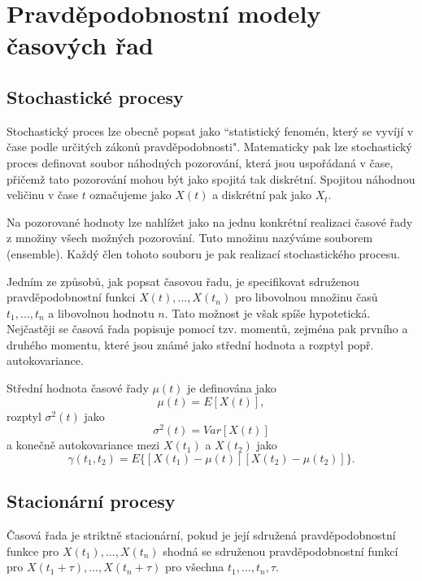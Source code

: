 \chapter{Pravděpodobnostní modely časových řad}

\section{Stochastické procesy}

Stochastický proces lze obecně popsat jako ``statistický fenomén, který se vyvíjí v čase podle určitých zákonů pravděpodobnosti". Matematicky pak lze stochastický proces definovat soubor náhodných pozorování, která jsou uspořádaná v čase, přičemž tato pozorování mohou být jako spojitá tak diskrétní. Spojitou náhodnou veličinu v čase $t$ označujeme jako $X(t)$ a diskrétní pak jako $X_t$.

Na pozorované hodnoty lze nahlížet jako na jednu konkrétní realizaci časové řady z množiny všech možných pozorování. Tuto množinu nazýváme souborem (ensemble). Každý člen tohoto souboru je pak realizací stochastického procesu.

Jedním ze způsobů, jak popsat časovou řadu, je specifikovat sdruženou pravděpodobnostní funkci $X(t), ..., X(t_n)$ pro libovolnou množinu časů $t_1, ..., t_n$ a libovolnou hodnotu $n$. Tato možnost je však spíše hypotetická. Nejčastěji se časová řada popisuje pomocí tzv. momentů, zejména pak prvního a druhého momentu, které jsou známé jako střední hodnota a rozptyl popř. autokovariance.

Střední hodnota časové řady $\mu(t)$ je definována jako
\begin{equation}
\mu(t) = E[X(t)],
\end{equation}
rozptyl $\sigma^2(t)$ jako
\begin{equation}
\sigma^2(t) = Var[X(t)]
\end{equation}
a konečně autokovariance mezi $X(t_1)$ a $X(t_2)$ jako
\begin{equation}
\gamma(t_1, t_2) = E\{[X(t_1) - \mu(t)][X(t_2) - \mu(t_2)]\}.
\end{equation}

\section{Stacionární procesy}

Časová řada je striktně stacionární, pokud je její sdružená pravděpodobnostní funkce pro $X(t_1), ..., X(t_n)$ shodná se sdruženou pravděpodobnostní funkcí pro $X(t_1 + \tau), ..., X(t_n + \tau)$ pro všechna $t_1, ..., t_n, \tau$.

